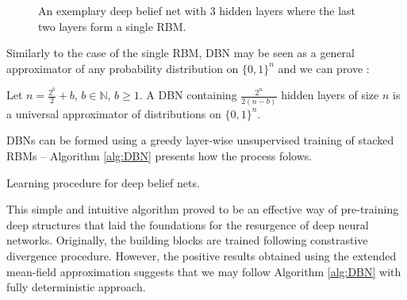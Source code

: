 \begin{figure}[!h]
\begin{center}
  \caption[Deep belief net]{An exemplary deep belief net with $3$ hidden layers where the last two layers form a single RBM.}
    \label{fig:DBN}
\end{center}
\end{figure}

Similarly to the case of the single RBM, DBN may be seen as a general approximator of any probability distribution on $\{0,1 \}^n$ and we can prove \cite{montufar2010refinements}
:
\begin{theorem} [Guido-Ay, 2010] Let $n = \frac{2^b}{2} + b$, $b \in \mathbb{N}$, $b \geqslant 1$. A DBN containing $\frac{2^n}{2(n-b)}$ hidden layers of size $n$ is a universal approximator of distributions on $\{0,1 \}^n$.
\end{theorem}

DBNs can be formed using a greedy layer-wise unsupervised training of stacked RBMs -- Algorithm \ref{alg:DBN} presents how the process folows.
\begin{algorithm}[!bthp]
\caption{Learning procedure for deep belief nets.}
\label{alg:DBN}
\begin{algorithmic}
\EndFor
\end{algorithmic}
\end{algorithm}
This simple and intuitive algorithm proved to be an effective way of pre-training deep structures that laid the foundations for the resurgence of deep neural networks. Originally, the building blocks are trained following constrastive divergence 
procedure.  However, the positive results obtained using the extended mean-field approximation suggests that we may follow Algorithm \ref{alg:DBN} with fully deterministic approach.

